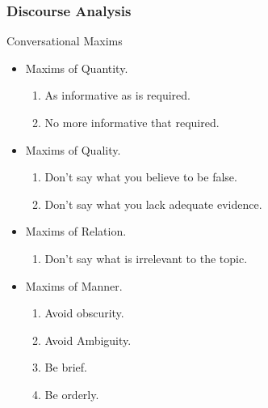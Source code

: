 \documentclass{beamer}
\begin{document}
\begin{frame}
\frametitle{Discourse Analysis}
\begin{block}{Conversational Maxims}
\begin{itemize}
\item Maxims of Quantity.
	\begin{enumerate}
	\item As informative as is required.
	\item No more informative that required.
	\end{enumerate}
\item Maxims of Quality.
	\begin{enumerate}
	\item Don't say what you believe to be false.
	\item Don't say what you lack adequate evidence.
	\end{enumerate}
\item Maxims of Relation.
	\begin{enumerate}
	\item Don't say what is irrelevant to the topic.
	\end{enumerate}
\item Maxims of Manner.
	\begin{enumerate}
	\item Avoid obscurity.
	\item Avoid Ambiguity.
	\item Be brief.
	\item Be orderly.
	\end{enumerate}
\end{itemize}
\end{block}
\end{frame}
\end{document}
